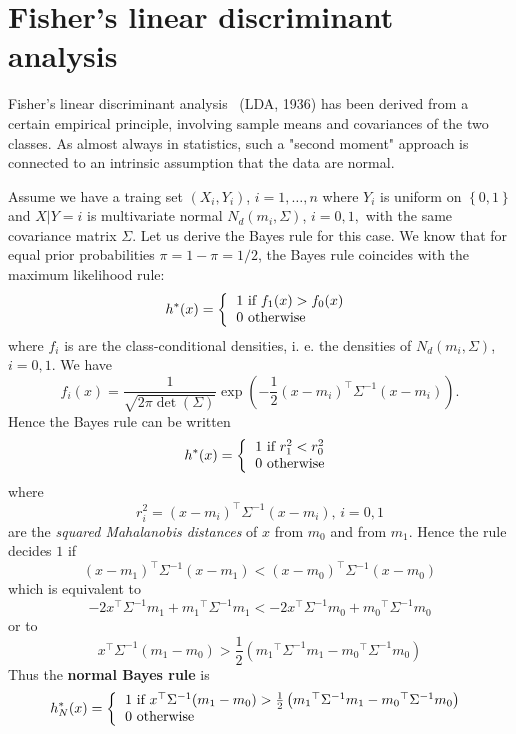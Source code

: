 \documentclass[11pt,twoside]{article}%
\theoremstyle{change}
\begin{document}
\pagebreak

\section{Fisher's linear discriminant analysis}

Fisher's linear discriminant analysis \ (LDA, 1936) has been derived from a
certain empirical principle, involving sample means and covariances of the two
classes. As almost always in statistics, such a "second moment" approach is
connected to an intrinsic assumption that the data are normal.

Assume we have a traing set $\left(  X_{i},Y_{i}\right)  $, $i=1,\ldots,n$
where $Y_{i}$ is uniform on $\left\{  0,1\right\}  $ and $X|Y=i$ is
multivariate normal $N_{d}\left(  m_{i},\Sigma\right)  $, $i=0,1,$ with the
same covariance matrix $\Sigma$. Let us derive the Bayes rule for this case.
We know that for equal prior probabilities $\pi=1-\pi=1/2$, the Bayes rule
coincides with the maximum likelihood rule:
\[
h^{\ast}(x)=\left\{
\begin{tabular}
[c]{l}%
$1$ if $f_{1}(x)>f_{0}(x)$\\
$0$ otherwise
\end{tabular}
\right.
\]
where $f_{i}$ is are the class-conditional densities, i. e. the densities of
$N_{d}\left(  m_{i},\Sigma\right)  $, $i=0,1.$ We have
\[
f_{i}(x)=\frac{1}{\sqrt{2\pi\det(\Sigma)}}\exp\left(  -\frac{1}{2}%
(x-m_{i})^{\top}\Sigma^{-1}(x-m_{i})\right)  .
\]
Hence the Bayes rule can be written
\[
h^{\ast}(x)=\left\{
\begin{tabular}
[c]{l}%
$1$ if $r_{1}^{2}<r_{0}^{2}$\\
$0$ otherwise
\end{tabular}
\right.
\]
where
\[
r_{i}^{2}=(x-m_{i})^{\top}\Sigma^{-1}(x-m_{i})\text{, }i=0,1
\]
are the \textit{squared Mahalanobis distances} of $x$ from $m_{0}$ and from
$m_{1}$. Hence the rule decides $1$ if
\[
(x-m_{1})^{\top}\Sigma^{-1}(x-m_{1})<(x-m_{0})^{\top}\Sigma^{-1}(x-m_{0})
\]
which is equivalent to
\[
-2x^{\top}\Sigma^{-1}m_{1}+m_{1}{}^{\top}\Sigma^{-1}m_{1}<-2x^{\top}%
\Sigma^{-1}m_{0}+m_{0}{}^{\top}\Sigma^{-1}m_{0}%
\]
or to
\[
x^{\top}\Sigma^{-1}(m_{1}-m_{0})>\frac{1}{2}\left(  m_{1}{}^{\top}\Sigma
^{-1}m_{1}-m_{0}{}^{\top}\Sigma^{-1}m_{0}\right)
\]
Thus the \textbf{normal Bayes rule} is
\begin{equation}
h_{N}^{\ast}(x)=\left\{
\begin{tabular}
[c]{l}%
$1$ if $x^{\top}\Sigma^{-1}(m_{1}-m_{0})>\frac{1}{2}\left(  m_{1}{}^{\top
}\Sigma^{-1}m_{1}-m_{0}{}^{\top}\Sigma^{-1}m_{0}\right)  $\\
$0$ otherwise
\end{tabular}
\right. \label{normal-bayes-rule}%
\end{equation}
\end{document}
